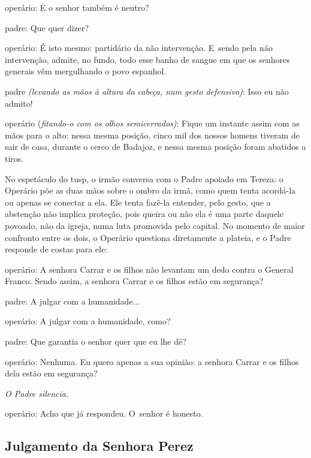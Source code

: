 {\startblockquote
{\sc operário}: E o senhor também é neutro?

{\sc padre}: Que quer dizer?

{\sc operário}: É isto mesmo: partidário da não intervenção. E~sendo pela
não intervenção, admite, no fundo, todo esse banho de sangue em que os
senhores generais vêm mergulhando o povo espanhol.

{\sc padre} {\it (levando as mãos à altura da cabeça, num gesto defensivo)}:
Isso eu não admito!

{\sc operário} ({\it fitando-o com os olhos semicerrados)}: Fique um instante
assim com as mãos para o alto: nessa mesma posição, cinco mil dos nossos
homens tiveram de sair de casa, durante o cerco de Badajoz, e nessa
mesma posição foram abatidos a tiros.
\stopblockquote

No espetáculo do {\sc tusp}, o irmão conversa com o Padre apoiado em Tereza: o
Operário põe as duas mãos sobre o ombro da irmã, como quem tenta
acordá-la ou apenas se conectar a ela. Ele tenta fazê-la entender, pelo
gesto, que a abstenção não implica proteção, pois queira ou não ela é
uma parte daquele povoado, não da igreja, numa luta promovida pelo
capital. No momento de maior confronto entre os dois, o Operário
questiona diretamente a plateia, e o Padre responde de costas para ele:

\startblockquote
{\sc operário}: A senhora Carrar e os filhos não levantam um dedo contra o
General Franco. Sendo assim, a senhora Carrar e os filhos estão em
segurança?

{\sc padre}: A julgar com a humanidade...

{\sc operário}: A julgar com a humanidade, como?

{\sc padre}: Que garantia o senhor quer que eu lhe dê?

{\sc operário}: Nenhuma. Eu quero apenas a sua opinião: a senhora Carrar e os
filhos dela estão em segurança?

{\it O Padre silencia.}

{\sc operário}: Acho que já respondeu. O~senhor é honesto.
\stopblockquote


\subsection{Julgamento da Senhora Perez}

}
